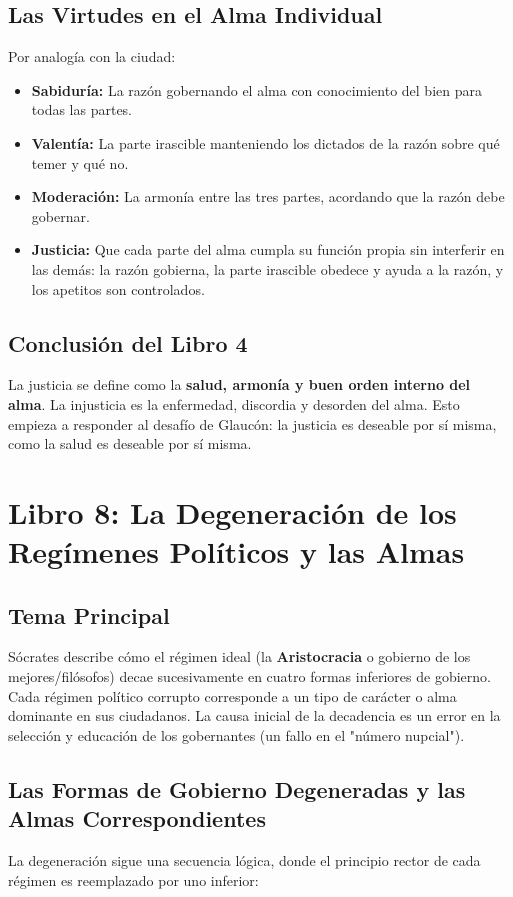 \documentclass[11pt, a4paper]{article}
\begin{document}
\subsection*{Las Virtudes en el Alma Individual}
Por analogía con la ciudad:
\begin{itemize}
    \item \textbf{Sabiduría:} La razón gobernando el alma con conocimiento del bien para todas las partes.
    \item \textbf{Valentía:} La parte irascible manteniendo los dictados de la razón sobre qué temer y qué no.
    \item \textbf{Moderación:} La armonía entre las tres partes, acordando que la razón debe gobernar.
    \item \textbf{Justicia:} Que cada parte del alma cumpla su función propia sin interferir en las demás: la razón gobierna, la parte irascible obedece y ayuda a la razón, y los apetitos son controlados.
\end{itemize}

\subsection*{Conclusión del Libro 4}
La justicia se define como la \textbf{salud, armonía y buen orden interno del alma}. La injusticia es la enfermedad, discordia y desorden del alma. Esto empieza a responder al desafío de Glaucón: la justicia es deseable por sí misma, como la salud es deseable por sí misma.

\section*{Libro 8: La Degeneración de los Regímenes Políticos y las Almas}

\subsection*{Tema Principal}
Sócrates describe cómo el régimen ideal (la \textbf{Aristocracia} o gobierno de los mejores/filósofos) decae sucesivamente en cuatro formas inferiores de gobierno. Cada régimen político corrupto corresponde a un tipo de carácter o alma dominante en sus ciudadanos. La causa inicial de la decadencia es un error en la selección y educación de los gobernantes (un fallo en el "número nupcial").

\subsection*{Las Formas de Gobierno Degeneradas y las Almas Correspondientes}
La degeneración sigue una secuencia lógica, donde el principio rector de cada régimen es reemplazado por uno inferior:
\end{document}

